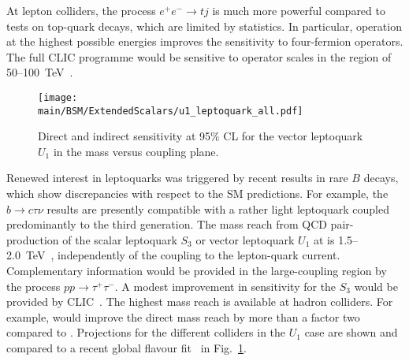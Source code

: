 \documentclass[../report.tex]{subfiles}
\providecommand{\main}{..}
\begin{document}
At lepton colliders, the process $e^{+}e^{-} \rightarrow tj$ is much more powerful compared to tests on top-quark decays, which are limited by statistics. In particular, operation at the highest possible energies improves the sensitivity to four-fermion operators. The full CLIC programme would be sensitive to operator scales in the region of 50--100~TeV~\cite{deBlas:2018mhx}.

\begin{figure}[ht]
\centering
\texttt{[image: \\main/BSM/ExtendedScalars/u1\_leptoquark\_all.pdf]}
\caption{
Direct and indirect sensitivity at 95\% CL for the vector leptoquark $U_{1}$ in the mass versus coupling plane.}
\label{fig:leptoquarks}
\end{figure}

Renewed interest in leptoquarks was triggered by recent results in rare $B$ decays, which show discrepancies with respect to the SM predictions. For example, the $b \rightarrow c\tau\nu$ results are presently compatible with a rather light leptoquark coupled predominantly to the third generation. The mass reach from QCD pair-production of the scalar leptoquark $S_{3}$ or vector leptoquark $U_{1}$ at \HLLHC is 1.5--2.0~TeV~\cite{CidVidal:2018eel}, independently of the coupling to the lepton-quark current. Complementary information would be provided in the large-coupling region by the process $pp \rightarrow \tau^{+}\tau^{-}$. A modest improvement in sensitivity for the $S_{3}$ would be provided by CLIC~\cite{deBlas:2018mhx}. The highest mass reach is available at hadron colliders. For example, \HELHC would improve the direct mass reach by more than a factor two compared to \HLLHC. Projections for the different colliders in the $U_{1}$ case are shown and compared to a recent global flavour fit~\cite{Cornella:2019hct} in Fig.~\ref{fig:leptoquarks}.
\end{document}
